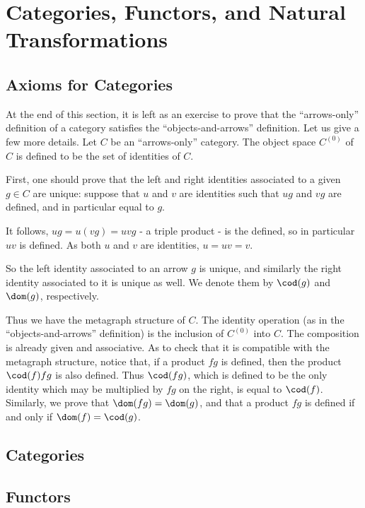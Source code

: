 \maketitle

\chapter{Categories, Functors, and Natural Transformations}

\section{Axioms for Categories}

At the end of this section, it is left as an exercise to prove that the ``arrows-only'' definition of a category satisfies the ``objects-and-arrows'' definition. Let us give a few more details. Let $C$ be an ``arrows-only'' category. The object space $C^{(0)}$ of $C$ is defined to be the set of identities of $C$.

First, one should prove that the left and right identities associated to a given $g\in C$ are unique: suppose that $u$ and $v$ are identities such that $ug$ and $vg$ are defined, and in particular equal to $g$.

It follows, $ug=u(vg)=uvg$ - a triple product - is the defined, so in particular $uv$ is defined. As both $u$ and $v$ are identities, $u=uv=v$.

So the left identity associated to an arrow $g$ is unique, and similarly the right identity associated to it is unique as well. We denote them by $\cod(g)$ and $\dom(g)$, respectively.

Thus we have the metagraph structure of $C$. The identity operation (as in the ``objects-and-arrows'' definition) is the inclusion of $C^{(0)}$ into $C$. The composition is already given and associative. As to check that it is compatible with the metagraph structure, notice that, if a product $fg$ is defined, then the product $\cod(f)fg$ is also defined. Thus $\cod(fg)$, which is defined to be the only identity which may be multiplied by $fg$ on the right, is equal to $\cod(f)$. Similarly, we prove that $\dom(fg)=\dom(g)$, and that a product $fg$ is defined if and only if $\dom(f)=\cod(g)$.

\section{Categories}

\section{Functors}

